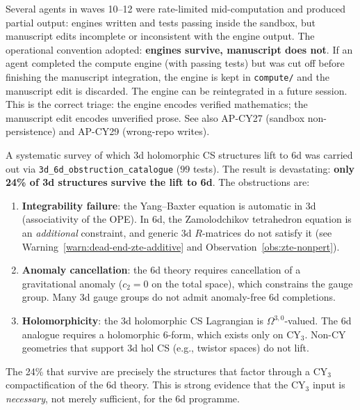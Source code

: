\documentclass[11pt]{article}
\begin{document}
\begin{warning}
\label{warn:dead-end-rate-limited}
Several agents in waves 10--12 were rate-limited mid-computation and
produced partial output: engines written and tests passing inside the
sandbox, but manuscript edits incomplete or inconsistent with the
engine output. The operational convention adopted: \textbf{engines
survive, manuscript does not}. If an agent completed the compute
engine (with passing tests) but was cut off before finishing the
manuscript integration, the engine is kept in \texttt{compute/}
and the manuscript edit is discarded. The engine can be reintegrated
in a future session. This is the correct triage: the engine encodes
verified mathematics; the manuscript edit encodes unverified prose.
See also AP-CY27 (sandbox non-persistence) and AP-CY29 (wrong-repo
writes).
\end{warning}

\begin{warning}
\label{warn:dead-end-3d-6d}
A systematic survey of which 3d holomorphic CS structures lift to 6d
was carried out via \texttt{3d\_6d\_obstruction\_catalogue} ($99$ tests).
The result is devastating: \textbf{only 24\% of 3d structures survive
the lift to 6d}. The obstructions are:
\begin{enumerate}[label=\textup{(\roman*)}]
 \item \textbf{Integrability failure}: the Yang--Baxter equation is
 automatic in 3d (associativity of the OPE). In 6d, the Zamolodchikov
 tetrahedron equation is an \emph{additional} constraint, and generic
 3d $R$-matrices do not satisfy it (see Warning~\ref{warn:dead-end-zte-additive}
 and Observation~\ref{obs:zte-nonpert}).
 \item \textbf{Anomaly cancellation}: the 6d theory requires
 cancellation of a gravitational anomaly ($c_2 = 0$ on the total
 space), which constrains the gauge group. Many 3d gauge groups do
 not admit anomaly-free 6d completions.
 \item \textbf{Holomorphicity}: the 3d holomorphic CS Lagrangian is
 $\Omega^{3,0}$-valued. The 6d analogue requires a holomorphic
 $6$-form, which exists only on CY$_3$. Non-CY geometries that
 support 3d hol CS (e.g., twistor spaces) do not lift.
\end{enumerate}
The 24\% that survive are precisely the structures that factor through
a CY$_3$ compactification of the 6d theory. This is strong evidence
that the CY$_3$ input is \emph{necessary}, not merely sufficient,
for the 6d programme.
\end{warning}
\end{document}
